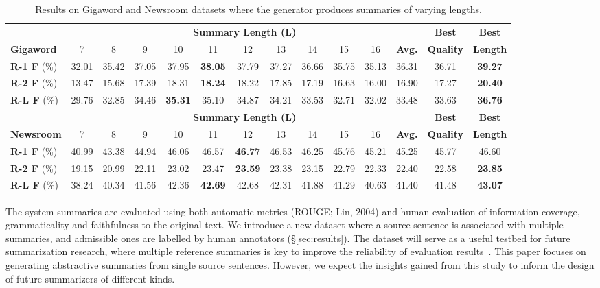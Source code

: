 \documentclass[11pt]{article}
\begin{document}
\begin{table*}[t]
\setlength{\tabcolsep}{6pt}
\renewcommand{\arraystretch}{1.2}
\centering
\begin{fontpbk}
\begin{scriptsize}
\begin{tabular}{|l|ccccccccccc|c|c|}
\hline
& \multicolumn{11}{c|}{\textbf{Summary Length (L)}} & \textbf{Best} & \textbf{Best} \\
\textbf{Gigaword} & 7 & 8 & 9 & 10 & 11 & 12 & 13 & 14 & 15 & 16 & \textbf{Avg.} & \textbf{Quality} & \textbf{Length}\\
\hdashline
\textbf{R-1 F} (\%) & 32.01 & 35.42 & 37.05 & 37.95 & \textbf{38.05} & 37.79 & 37.27 & 36.66 & 35.75 & 35.13 & 36.31 & 36.71 & \textbf{39.27}\\
\textbf{R-2 F} (\%) & 13.47 & 15.68 & 17.39 & 18.31 & \textbf{18.24} & 18.22 & 17.85 & 17.19 & 16.63 & 16.00 & 16.90 & 17.27 & \textbf{20.40}\\
\textbf{R-L F} (\%) & 29.76 & 32.85 & 34.46 & \textbf{35.31} & 35.10 & 34.87 & 34.21 & 33.53 & 32.71 & 32.02 & 33.48 & 33.63 & \textbf{36.76}\\
\hline
\hline
& \multicolumn{11}{c|}{\textbf{Summary Length (L)}} & \textbf{Best} & \textbf{Best} \\
\textbf{Newsroom} & 7 & 8 & 9 & 10 & 11 & 12 & 13 & 14 & 15 & 16 & \textbf{Avg.} & \textbf{Quality} & \textbf{Length}\\
\hdashline
\textbf{R-1 F} (\%) & 40.99 & 43.38 & 44.94 & 46.06 & 46.57 & \textbf{46.77} & 46.53 & 46.25 & 45.76 & 45.21 & 45.25 & 45.77 & 46.60\\
\textbf{R-2 F} (\%) & 19.15 & 20.99 & 22.11 & 23.02 & 23.47 & \textbf{23.59} & 23.38 & 23.15 & 22.79 & 22.33 & 22.40 & 22.58 & \textbf{23.85}\\
\textbf{R-L F} (\%) & 38.24 & 40.34 & 41.56 & 42.36 & \textbf{42.69} & 42.68 & 42.31 & 41.88 & 41.29 & 40.63 & 41.40 & 41.48 & \textbf{43.07}\\
\hline
\end{tabular}
\end{scriptsize}
\end{fontpbk}
\vspace{-0.05in}
\caption{Results on Gigaword and Newsroom datasets where the generator produces summaries of varying lengths.
}
\label{tab:results_varying_lengths}
\vspace{-0.15in}
\end{table*}


The system summaries are evaluated using both automatic metrics (ROUGE; Lin, 2004)\nocite{lin-2004-rouge} and human evaluation of information coverage, grammaticality and faithfulness to the original text.
We introduce a new dataset where a source sentence is associated with multiple summaries, and admissible ones are labelled by human annotators (\S\ref{sec:results}).
The dataset will serve as a useful testbed for future summarization research, where multiple reference summaries is key to improve the reliability of evaluation results~\cite{louis-nenkova-2013-automatically}.
This paper focuses on generating abstractive summaries from single source sentences. 
However, we expect the insights gained from this study to inform the design of future summarizers of different kinds.
\end{document}
